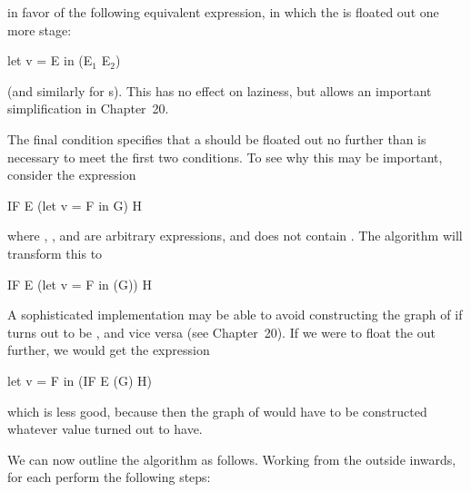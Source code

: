 \noindent
in favor of the following equivalent expression, in which the  is floated out
one more stage:

\begin{mlcoded}
    let v = E in (E$_1$ E$_2$)
\end{mlcoded}

\noindent
(and similarly for s). This has no effect on laziness, but allows an
important simplification in Chapter~20.

The final condition specifies that a  should be floated out no further
than is necessary to meet the first two conditions. To see why this may be
important, consider the expression

\begin{mlcoded}
    IF E (let v = F in G) H
\end{mlcoded}

\noindent
where , ,  and  are arbitrary expressions, and  does not contain . The
algorithm will transform this to

\begin{mlcoded}
    IF E (let v = F in (G)) H
\end{mlcoded}

\noindent
A sophisticated implementation may be able to avoid constructing the graph
of  if  turns out to be , and vice versa (see Chapter~20). If we were to
float the  out further, we would get the expression

\begin{mlcoded}
    let v = F in (IF E (G) H)
\end{mlcoded}

\noindent
which is less good, because then the graph of  would have to be constructed
whatever value  turned out to have.

We can now outline the algorithm as follows. Working from the outside
inwards, for each  perform the following steps:

